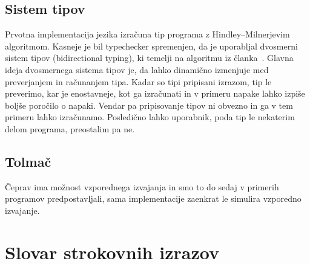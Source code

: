 \subsection{Sistem tipov}\label{sec:tipi}

Prvotna implementacija jezika \aeff{} izračuna tip programa z Hindley–Milnerjevim algoritmom. 
Kasneje je bil typechecker spremenjen, da je uporabljal dvosmerni sistem tipov (bidirectional typing), ki temelji na algoritmu iz članka~\cite{bidirectional}.
Glavna ideja dvosmernega sistema tipov je, da lahko dinamično izmenjuje med preverjanjem in računanjem tipa. Kadar so tipi pripisani izrazom, tip le preverimo, kar je enostavneje, kot ga izračunati in v primeru napake lahko izpiše boljše poročilo o napaki. Vendar pa pripisovanje tipov ni obvezno in ga v tem primeru lahko izračunamo. Posledično lahko uporabnik, poda tip le nekaterim delom programa, preostalim pa ne.

\subsection{Tolmač}\label{sec:interpreter}

Čeprav ima \aeff{} možnost vzporednega izvajanja in smo to do sedaj v primerih programov predpostavljali, sama implementacije zaenkrat le simulira vzporedno izvajanje.


\section*{Slovar strokovnih izrazov}





